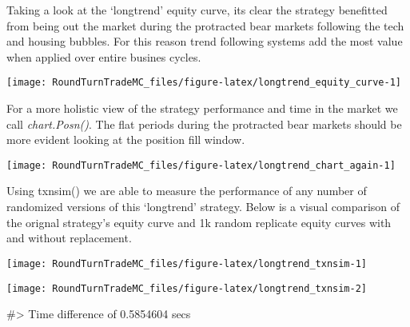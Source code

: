 Taking a look at the `longtrend' equity curve, its clear the strategy
benefitted from being out the market during the protracted bear markets
following the tech and housing bubbles. For this reason trend following
systems add the most value when applied over entire busines cycles.

\begin{Schunk}


\begin{center}\texttt{[image: RoundTurnTradeMC\_files/figure-latex/longtrend\_equity\_curve-1]} \end{center}

\end{Schunk}

For a more holistic view of the strategy performance and time in the
market we call \emph{chart.Posn()}. The flat periods during the
protracted bear markets should be more evident looking at the position
fill window.

\begin{Schunk}


\begin{center}\texttt{[image: RoundTurnTradeMC\_files/figure-latex/longtrend\_chart\_again-1]} \end{center}

\end{Schunk}

Using txnsim() we are able to measure the performance of any number of
randomized versions of this `longtrend' strategy. Below is a visual
comparison of the orignal strategy's equity curve and 1k random
replicate equity curves with and without replacement.

\begin{Schunk}


\begin{center}\texttt{[image: RoundTurnTradeMC\_files/figure-latex/longtrend\_txnsim-1]} \end{center}



\begin{center}\texttt{[image: RoundTurnTradeMC\_files/figure-latex/longtrend\_txnsim-2]} \end{center}

\begin{Soutput}
#> Time difference of 0.5854604 secs
\end{Soutput}
\end{Schunk}

